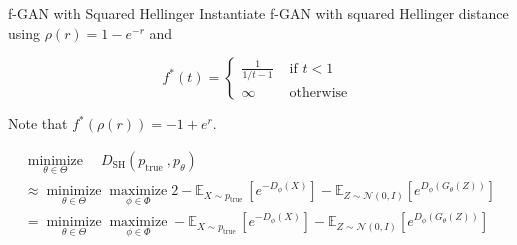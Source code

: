 \begin{frame}[allowframebreaks]

\begin{myconceptblock}{21.26}{f-GAN with Squared Hellinger}
    Instantiate f-GAN with squared Hellinger distance using $\rho(r)=1-e^{-r}$ and

    $$
    f^{*}(t)= \begin{cases}\frac{1}{1 / t-1} & \text { if } t<1 \\ \infty & \text { otherwise }\end{cases}
    $$

    Note that $f^{*}(\rho(r))=-1+e^{r}$.

    $$
    \begin{gathered}
    \underset{\theta \in \Theta}{\operatorname{minimize}} \quad D_{\mathrm{SH}}\left(p_{\text {true }}, p_{\theta}\right) \\
    \approx \underset{\theta \in \Theta}{\operatorname{minimize}} \underset{\phi \in \Phi}{\operatorname{maximize}} 2-\mathbb{E}_{X \sim p_{\text {true }}}\left[e^{-D_{\phi}(X)}\right]-\mathbb{E}_{Z \sim \mathcal{N}(0, I)}\left[e^{D_{\phi}\left(G_{\theta}(Z)\right)}\right] \\
    = \underset{\theta \in \Theta}{\operatorname{minimize}} \underset{\phi \in \Phi}{\operatorname{maximize}} -\mathbb{E}_{X \sim p_{\text {true }}}\left[e^{-D_{\phi}(X)}\right]-\mathbb{E}_{Z \sim \mathcal{N}(0, I)}\left[e^{D_{\phi}\left(G_{\theta}(Z)\right)}\right]
    \end{gathered}
    $$
\end{myconceptblock}

\end{frame}

